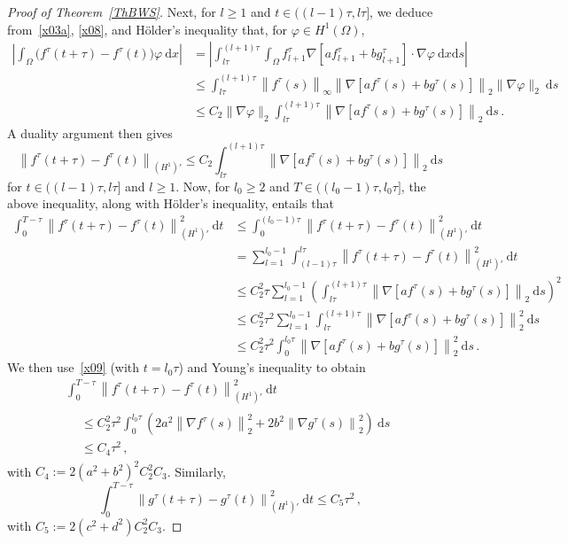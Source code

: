 \documentclass[10pt]{amsart}
\theoremstyle{definition}\newtheorem{defi}[theo]{Definition}\newtheorem{rema}[theo]{Remark}\newtheorem{exam}[theo]{Example}\newtheorem{exem}[theo]{Example}\newtheorem{nota}[theo]{Notation}
\newcommand{\rmd}{\mathrm{d}}
\begin{document}
\begin{proof}[Proof of Theorem~\ref{ThBWS}]
Next, for $l\ge 1$ and $t\in ((l-1)\tau,l\tau]$, we deduce from~\eqref{x03a}, \eqref{x08}, and H\"older's inequality that, for $\varphi\in H^1(\Omega)$,
\begin{align*}
\left| \int_\Omega \big(f^{\tau}(t+\tau) - f^\tau(t) \big) \varphi\ \rmd x \right| & =
\left| \int_{l\tau}^{(l+1) \tau} \int_\Omega f_{l+1}^\tau \nabla\left[af_{l+1}^\tau + b g_{l+1}^\tau\right] \cdot\nabla \varphi\ \rmd x\rmd s \right| \\
& \le \int_{l\tau}^{(l+1) \tau} \left\| f^\tau(s)\right\|_\infty \left\|\nabla\left[af^\tau(s) + b g^\tau(s)\right]\right\|_2 \|\nabla\varphi\|_2\ \rmd s \\
& \le C_2 \|\nabla\varphi\|_2 \int_{l\tau}^{(l+1) \tau} \left\|\nabla\left[af^\tau(s) + b g^\tau(s)\right]\right\|_2\ \rmd s \,.
\end{align*}
A duality argument then gives
\begin{equation*}
\left\| f^{\tau}(t+\tau) - f^\tau(t) \right\|_{(H^1)'} \le C_2 \int_{l\tau}^{(l+1) \tau} \left\|\nabla\left[af^\tau(s) + b g^\tau(s)\right]\right\|_2\ \rmd s
\end{equation*}
for $t\in ((l-1)\tau,l\tau]$ and $l\ge 1$. Now, for $l_0\ge 2$ and $T\in ((l_0-1)\tau,l_0\tau]$, the above inequality, along with H\"older's inequality, entails that
\begin{align*}
\int_0^{T-\tau} \left\| f^{\tau}(t+\tau) - f^\tau(t) \right\|_{(H^1)'}^2\ \rmd t & \le \int_0^{(l_0-1)\tau} \left\| f^{\tau}(t+\tau) - f^\tau(t)\right\|_{(H^1)'}^2\ \rmd t \\
& =\sum_{l=1}^{l_0-1} \int_{(l-1)\tau}^{l\tau} \left\| f^{\tau}(t+\tau) - f^\tau(t) \right\|_{(H^1)'}^2\ \rmd t \\
& \le C_2^2 \tau \sum_{l=1}^{l_0-1} \left(\int_{l\tau}^{(l+1) \tau} \left\|\nabla\left[af^\tau(s) + b g^\tau(s)\right]\right\|_2\ \rmd s \right)^2\\
& \le C_2^2 \tau^2 \sum_{l=1}^{l_0-1} \int_{l\tau}^{(l+1) \tau} \left\|\nabla\left[af^\tau(s) + b g^\tau(s)\right]\right\|_2^2\ \rmd s \\
& \le C_2^2 \tau^2 \int_{0}^{l_0 \tau}\left\|\nabla\left[af^\tau(s) + b g^\tau(s)\right]\right\|_2^2\ \rmd s\,.
\end{align*}
We then use~\eqref{x09} (with $t=l_0\tau$) and Young's inequality to obtain
\begin{multline}\label{x10}
\int_0^{T-\tau} \left\| f^{\tau}(t+\tau) - f^\tau(t) \right\|_{(H^1)'}^2\ \rmd t\\
\begin{aligned}
& \le C_2^2 \tau^2
\int_{0}^{l_0\tau} \left(2 a^2 \left\|\nabla f^\tau(s)\right\|_2^2 + 2b^2 \left\|\nabla g^\tau(s)\right\|_2^2 \right)\ \rmd s \\
& \le C_4 \tau^2 \,, 
\end{aligned}
\end{multline}
with $C_4 := 2 (a^2+b^2)^2 C_2^2 C_3$. Similarly,
\begin{equation}\label{x11}
\int_0^{T-\tau} \left\| g^{\tau}(t+\tau) - g^\tau(t) \right\|_{(H^1)'}^2\ \rmd t \le C_5 \tau^2 \,, 
\end{equation}
with $C_5 := 2 (c^2+d^2) C_2^2 C_3$.


\end{proof}
\end{document}
